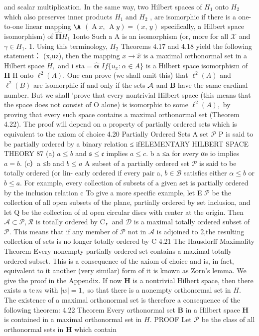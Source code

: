and scalar multiplication. In the same way, two Hilbert spaces of $H_{1}$ onto $\textstyle H_{2}$ which also preserves inner products $\textstyle H_{1}$ and $H_{2}$ , are isomorphic if there is a one-to-one linear mapping $\mathrm{\A}$ $(\operatorname{A}\!x,\,\operatorname{A}\!y)=(x,\,y)$ specifically, a Hilbert space isomorphism) of $\mathbf{\hat{\Pi}}H_{1}$ 1onto Such a A is an isomorphism (or, more for all $\scriptstyle{\mathcal{X}}$ and $\gamma\in H_{1}.$ 1. Using this terminology, $H_{2}$ Theorems 4.17 and 4.18 yield the following statement： (x,uz), then the mapping $x\to{\hat{x}}$ is a maximal orthonormal set in a Hilbert space $\textstyle H,$ and i ${\mathrm{sta}}={\hat{\mathbf{\alpha}}}$ $I f\{u_{x}\colon\alpha\in A\}$ is a Hilbert space isomorphism of ${\boldsymbol{H}}$ H onto $\ell^{2}(A).$ One can prove (we shall omit this) that $\ell^{2}(A)$ and $\ell^{2}(B)$ are isomorphic if and only if the sets ${\cal A}$ and $\boldsymbol{B}$ have the same cardinal number. But we shall 'prove that every nontrivial Hilbert space (this means that the space does not consist of O alone) is isomorphic to some $\ell^{2}(A),$ by proving that every such space contains a maximal orthonormal set (Theorem 4.22). The proof will depend on a property of partially ordered sets which is equivalent to the axiom of choice 4.20 Partially Ordered Sets A set $\mathcal{P}$ P is said to be partially ordered by a binary relation ≤ ifELEMENTARY HILBERT SPACE THEORY 87 (a) $a\leq b$ and ${\mathfrak{s}}\leq{\mathfrak{c}}$ implies $a\leq c.$ b a ≤a for every αe io implies $a=b.$ (c）a ≤b and $b\leq a$ A subset of a partially ordered set $\mathcal{P}$ is said to be totally ordered (or lin- early ordered if every pair a, $b\in{\mathcal{B}}$ satisfies either $\alpha\leq b$ or $b\leq a.$ For example, every collection of subsets of a given set is partially ordered by the inclusion relation c To give a more specific example, let E $\mathcal{P}$ be the collection of all open subsets of the plane, partially ordered by set inclusion, and let Q be the collection of al open circular discs with center at the origin. Then ${\mathcal{A}}\subset{\mathcal{P}},{\mathcal{R}}$ is totally ordered by C，and $\scriptstyle{\mathcal{D}}$ is a maximal totally ordered subset of ${\mathcal{P}}.$ This means that if any member of ${\mathcal{P}}$ not in $\textstyle{\mathcal{A}}$ is adjoined to 2,the resulting collection of sets is no longer totally ordered by C 4.21 The Hausdorff Maximality Theorem Every nonempty partially ordered set contains a maximal totally ordered subset. This is a consequence of the axiom of choice and is, in fact, equivalent to it another (very similar) form of it is known as Zorn's lemma. We give the proof in the Appendix. If now ${\boldsymbol{H}}$ is a nontrivial Hilbert space, then there exists a ${\underset{}{{\mathrm{te}}}}\,m$ with $|w|=1,$ so that there is a nonempty orthonormal set in $H.$ The existence of a maximal orthonormal set is therefore a consequence of the following theorem: 4.22 Theorem Every orthonormal set $\boldsymbol{B}$ in a Hilbert space ${\boldsymbol{H}}$ is contained in a maximal orthonormal set in $\textstyle H.$ PROOF Let $\textstyle{\mathcal{P}}$ be the class of all orthonormal sets in ${\boldsymbol{H}}$ which contain 